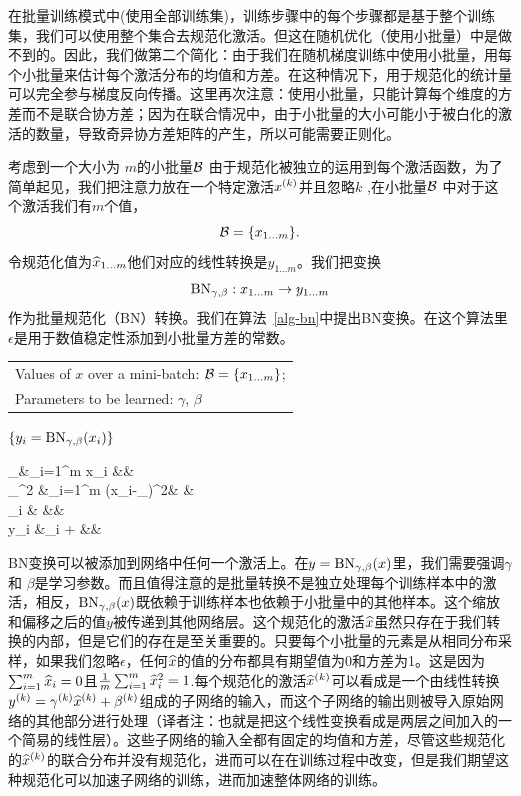 \documentclass[twocolumn]{article}
\begin{document}
在批量训练模式中(使用全部训练集)，训练步骤中的每个步骤都是基于整个训练集，我们可以使用整个集合去规范化激活。但这在随机优化（使用小批量）中是做不到的。因此，我们做第二个简化：由于我们在随机梯度训练中使用小批量，用每个小批量来估计每个激活分布的均值和方差。在这种情况下，用于规范化的统计量可以完全参与梯度反向传播。这里再次注意：使用小批量，只能计算每个维度的方差而不是联合协方差；因为在联合情况中，由于小批量的大小可能小于被白化的激活的数量，导致奇异协方差矩阵的产生，所以可能需要正则化。

考虑到一个大小为 $m$的小批量$\setB$ 由于规范化被独立的运用到每个激活函数，为了简单起见，我们把注意力放在一个特定激活$x^\kk$并且忽略$k$ ,在小批量$\setB$ 中对于这个激活我们有$m$个值，$$\setB=\{x_{1\ldots m}\}.$$令规范化值为$\xhat_{1\ldots m}$他们对应的线性转换是$y_{1\ldots m}$。我们把变换$$\BatchNorm_{\gamma,\beta}: x_{1\ldots m}\rightarrow y_{1\ldots m}$$作为批量规范化（BN）转换。我们在算法~\ref{alg-bn}中提出BN变换。在这个算法里$\epsilon$是用于数值稳定性添加到小批量方差的常数。

\begin{algorithm}
  \caption{BN变换，应用于小批量上的激活函数\mbox{activation $x$} }
\label{alg-bn}
  \begin{algorithmic}
  \REQUIRE 
  \begin{tabular}[t]{@{}l}Values of   $x$ over a mini-batch:
  $\setB=\{x_{1\ldots m}\}$;\\ 
 Parameters to be learned: $\gamma$,
    $\beta$ \end{tabular}
  \ENSURE $\{y_i =  \BN{x_i}{\gamma,\beta}\}$
  \begin{flalign*}
      \mu_\setB &\leftarrow {}\sum_{i=1}^m x_i &&\\
  \sigma_\setB^2 &\leftarrow {}\sum_{i=1}^m (x_i-\mu_\setB)^2& &\\
\xhat_i &\leftarrow {}   
&&\\
  y_i &\leftarrow \gamma\xhat_i + \beta  
  \equiv{}
    &&
  \end{flalign*}
\end{algorithmic}
\end{algorithm}

BN变换可以被添加到网络中任何一个激活上。在$y = \BN{x}{\gamma,\beta}$里，我们需要强调$\gamma$ 和 $\beta$是学习参数。而且值得注意的是批量转换不是独立处理每个训练样本中的激活，相反，$\BN{x}{\gamma,\beta}$既依赖于训练样本也依赖于小批量中的其他样本。这个缩放和偏移之后的值$y$被传递到其他网络层。这个规范化的激活$\xhat$虽然只存在于我们转换的内部，但是它们的存在是至关重要的。只要每个小批量的元素是从相同分布采样，如果我们忽略$\epsilon$，任何$\xhat$的值的分布都具有期望值为0和方差为1。这是因为$\sum_{i=1}^m \xhat_i = 0$且$\frac{1}{m}\sum_{i=1}^m \xhat_i^2 = 1$.每个规范化的激活$\xhat^\kk$可以看成是一个由线性转换$y^\kk=\gamma^\kk\xhat^\kk+\beta^\kk$组成的子网络的输入，而这个子网络的输出则被导入原始网络的其他部分进行处理（译者注：也就是把这个线性变换看成是两层之间加入的一个简易的线性层）。这些子网络的输入全都有固定的均值和方差，尽管这些规范化的$\xhat^\kk$的联合分布并没有规范化，进而可以在在训练过程中改变，但是我们期望这种规范化可以加速子网络的训练，进而加速整体网络的训练。
\end{document}
